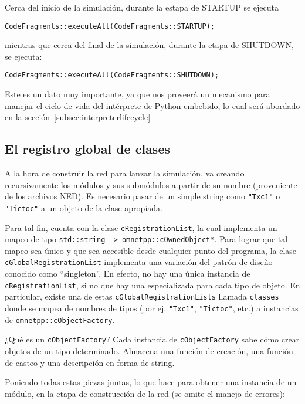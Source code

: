 Cerca del inicio de la simulación, durante la estapa de STARTUP se ejecuta

\begin{verbatim}
CodeFragments::executeAll(CodeFragments::STARTUP);
\end{verbatim}

mientras que cerca del final de la simulación, durante la etapa de SHUTDOWN, se ejecuta:

\begin{verbatim}
CodeFragments::executeAll(CodeFragments::SHUTDOWN);
\end{verbatim}

Este es un dato muy importante, ya que nos proveerá un mecanismo para manejar el ciclo de vida del intérprete de Python embebido,
lo cual será abordado en la sección~\ref{subsec:interpreterlifecycle}

\subsection{El registro global de clases}

A la hora de construir la red para lanzar la simulación, \omnetpp{} va creando
recursivamente los módulos y sus submódulos a partir de su nombre (proveniente
de los archivos NED). Es necesario pasar de un simple string como \verb!"Txc1"!
o \verb!"Tictoc"! a un objeto de la clase apropiada.

Para tal fin, \omnetpp{} cuenta con la clase \verb!cRegistrationList!, la cual
implementa un mapeo de tipo \verb!std::string -> omnetpp::cOwnedObject*!. Para
lograr que tal mapeo sea único y que sea accesible desde cualquier punto del
programa, la clase \verb!cGlobalRegistrationList! implementa una variación del
patrón de diseño conocido como ``singleton''. En efecto, no hay una única
instancia de \verb!cRegistrationList!, si no que hay una especializada para
cada tipo de objeto. En particular, existe una de estas
\verb!cGlobalRegistrationLists! llamada \verb!classes! donde se mapea de
nombres de tipos (por ej, \verb!"Txc1"!, \verb!"Tictoc"!, etc.) a instancias de
\verb!omnetpp::cObjectFactory!.

¿Qué es un \verb!cObjectFactory!? Cada instancia de \verb!cObjectFactory! sabe
cómo crear objetos de un tipo determinado. Almacena una función de creación,
una función de casteo y una descripción en forma de string.

Poniendo todas estas piezas juntas, lo que \omnetpp{} hace para obtener una
instancia de un módulo, en la etapa de construcción de la red (se omite el
manejo de errores):

